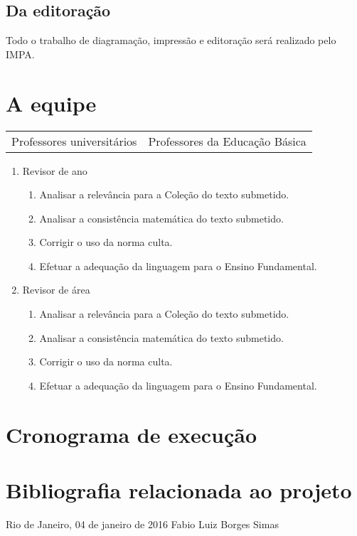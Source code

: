 \documentclass[10 pt]{article}
\begin{document}
\subsection{Da editoração}
Todo o trabalho de diagramação, impressão e editoração será realizado pelo IMPA.

 \section{A equipe}\label{equipe}
\begin{table}[ht] 
\begin{center}
\begin{tabular}{ll}
Professores universitários & Professores da Educação Básica  \\

\end{tabular}
\end{center}
\end{table}

 



 \begin{enumerate}%
  \item Revisor de ano
  \begin{enumerate}%
  \item Analisar a relevância para a Coleção do texto submetido.
  \item Analisar a consistência matemática do texto submetido. 
  \item Corrigir o uso da norma culta. 
  \item Efetuar a adequação da linguagem para o Ensino Fundamental. 
  \end{enumerate}
  
 \item Revisor de área
\begin{enumerate}%
  \item Analisar a relevância para a Coleção do texto submetido.
  \item Analisar a consistência matemática do texto submetido. 
  \item Corrigir o uso da norma culta. 
  \item Efetuar a adequação da linguagem para o Ensino Fundamental. 
\end{enumerate}
 
\end{enumerate}

 \section{Cronograma de execução}
 
 
\section{Bibliografia relacionada ao projeto}
 

   \begin{center}
Rio de Janeiro, 04 de janeiro de 2016 \hspace{2cm} Fabio Luiz Borges Simas     
\end{center}



%
\end{document}
